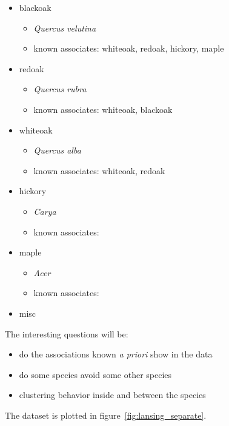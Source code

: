 \documentclass[12pt,a4paper,oneside,article]{memoir}
\begin{document}
\begin{itemize}
  \item blackoak
  	\begin{itemize}
  	  \item \emph{Quercus velutina}
  	  \item known associates: whiteoak, redoak, hickory, maple
  	\end{itemize} 
  \item redoak
   \begin{itemize}
  	  \item \emph{Quercus rubra}
  	  \item known associates: whiteoak, blackoak
  	\end{itemize}  
  \item whiteoak
   \begin{itemize}
  	  \item \emph{Quercus alba}
  	  \item known associates: whiteoak, redoak
  	\end{itemize}    
  \item hickory
   \begin{itemize}
  	  \item \emph{Carya}
  	  \item known associates:  
  	\end{itemize}  
  \item maple
   \begin{itemize}
  	  \item \emph{Acer}
  	  \item known associates: 
  	\end{itemize}  
  \item misc 
\end{itemize}  

The interesting questions will be:
\begin{itemize}
  \item do the associations known \emph{a priori} show in the data
  \item do some species avoid some other species
  \item clustering behavior inside and between the species
\end{itemize}
The dataset is plotted in figure~\ref{fig:lansing_separate}. 
\end{document}
